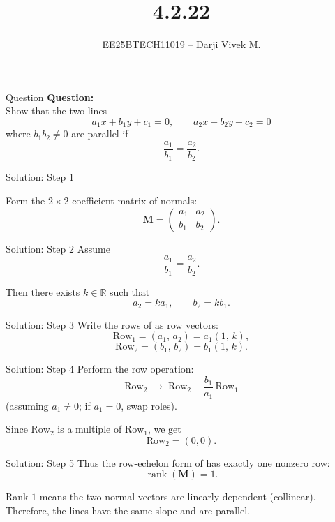 \documentclass{beamer}
\title{4.2.22}
\author{EE25BTECH11019 -- Darji Vivek M.}
\date{}
\newcommand{\myvec}[1]{\begin{pmatrix}#1\end{pmatrix}}
\renewcommand{\vec}[1]{\mathbf{#1}}
\begin{document}
\begin{frame}
\begin{titlepage}

\end{titlepage}
\end{frame}
\begin{frame}{Question}
\textbf{Question:}\\
Show that the two lines
\[
a_1 x + b_1 y + c_1 = 0,\qquad a_2 x + b_2 y + c_2 = 0
\]
where $b_1 b_2 \neq 0$ are parallel if 
\[
\frac{a_1}{b_1}=\frac{a_2}{b_2}.
\]
\end{frame}


\begin{frame}{Solution: Step 1}

Form the $2\times2$ coefficient matrix of normals:
\[
\vec{M} = \myvec{a_1 & a_2 \\ b_1 & b_2}.
\]
\end{frame}


\begin{frame}{Solution: Step 2}
Assume 
\[
\dfrac{a_1}{b_1}=\dfrac{a_2}{b_2}.
\]

Then there exists \(k \in \mathbb{R}\) such that
\[
a_2 = k a_1, 
\qquad 
b_2 = k b_1.
\]
\end{frame}


\begin{frame}{Solution: Step 3}
Write the rows of \vec{M} as row vectors:
\[
\text{Row}_1 = (a_1,\,a_2) = a_1(1,\,k),
\]
\[
\text{Row}_2 = (b_1,\,b_2) = b_1(1,\,k).
\]
\end{frame}


\begin{frame}{Solution: Step 4}
Perform the row operation:
\[
\text{Row}_2 \;\rightarrow\; \text{Row}_2 - \frac{b_1}{a_1}\,\text{Row}_1
\]
(assuming \(a_1\neq 0\); if \(a_1=0\), swap roles).

Since \(\text{Row}_2\) is a multiple of \(\text{Row}_1\), we get
\[
\text{Row}_2 = (0,0).
\]
\end{frame}


\begin{frame}{Solution: Step 5}
Thus the row-echelon form of \vec{M} has exactly one nonzero row:
\[
\operatorname{rank}(\vec{M}) = 1.
\]

Rank \(1\) means the two normal vectors are linearly dependent (collinear).  
Therefore, the lines have the same slope and are parallel.
\end{frame}
\end{document}
